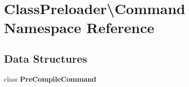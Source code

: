 \section{Class\+Preloader\textbackslash{}Command Namespace Reference}
\label{namespace_class_preloader_1_1_command}
\subsection*{Data Structures}
\begin{DoxyCompactItemize}
\item 
class {\bf Pre\+Compile\+Command}
\end{DoxyCompactItemize}
